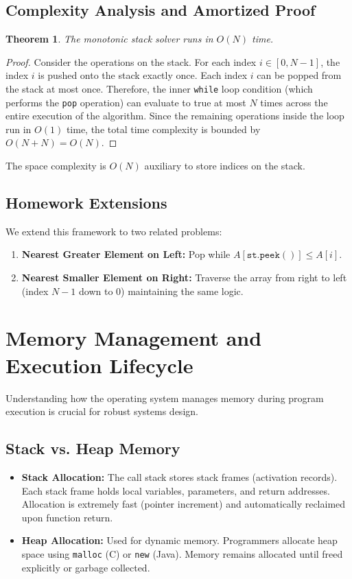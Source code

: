 \documentclass[10pt,journal,compsoc,onecolumn]{IEEEtran}
\newtheorem{theorem}{Theorem}
\begin{document}
\subsection{Complexity Analysis and Amortized Proof}
\begin{theorem}
The monotonic stack solver runs in $O(N)$ time.
\end{theorem}
\begin{proof}
Consider the operations on the stack. For each index $i \in [0, N-1]$, the index $i$ is pushed onto the stack exactly once. Each index $i$ can be popped from the stack at most once. Therefore, the inner \texttt{while} loop condition (which performs the \texttt{pop} operation) can evaluate to true at most $N$ times across the entire execution of the algorithm. Since the remaining operations inside the loop run in $O(1)$ time, the total time complexity is bounded by $O(N + N) = O(N)$.
\end{proof}

The space complexity is $O(N)$ auxiliary to store indices on the stack.

\subsection{Homework Extensions}
We extend this framework to two related problems:
\begin{enumerate}
    \item \textbf{Nearest Greater Element on Left:} Pop while $A[\mathtt{st.peek()}] \le A[i]$.
    \item \textbf{Nearest Smaller Element on Right:} Traverse the array from right to left (index $N-1$ down to $0$) maintaining the same logic.
\end{enumerate}

\section{Memory Management and Execution Lifecycle}
Understanding how the operating system manages memory during program execution is crucial for robust systems design.

\subsection{Stack vs. Heap Memory}
\begin{itemize}
    \item \textbf{Stack Allocation:} The call stack stores stack frames (activation records). Each stack frame holds local variables, parameters, and return addresses. Allocation is extremely fast (pointer increment) and automatically reclaimed upon function return.
    \item \textbf{Heap Allocation:} Used for dynamic memory. Programmers allocate heap space using \texttt{malloc} (C) or \texttt{new} (Java). Memory remains allocated until freed explicitly or garbage collected.
\end{itemize}
\end{document}
